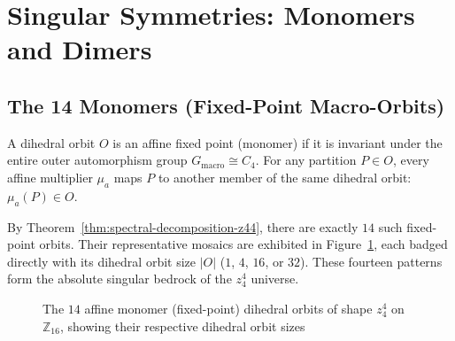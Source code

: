 \section{Singular Symmetries: Monomers and Dimers}
\label{sec:singular-symmetries}

\subsection{The 14 Monomers (Fixed-Point Macro-Orbits)}

A dihedral orbit $O$ is an affine fixed point (monomer) if it is invariant under the entire outer automorphism group $G_{\text{macro}} \cong C_4$. For any partition $P \in O$, every affine multiplier $\mu_a$ maps $P$ to another member of the same dihedral orbit: $\mu_a(P) \in O$. 

By Theorem~\ref{thm:spectral-decomposition-z44}, there are exactly $14$ such fixed-point orbits. Their representative mosaics are exhibited in Figure~\ref{fig:14-monomers}, each badged directly with its dihedral orbit size $|O|$ ($1$, $4$, $16$, or $32$). These fourteen patterns form the absolute singular bedrock of the $z_4^4$ universe.

\begin{figure}[htbp]
\centering

\caption{\label{fig:14-monomers}The $14$ affine monomer (fixed-point) dihedral orbits of shape $z_4^4$ on $\mathbb{Z}_{16}$, showing their respective dihedral orbit sizes}
\end{figure}

